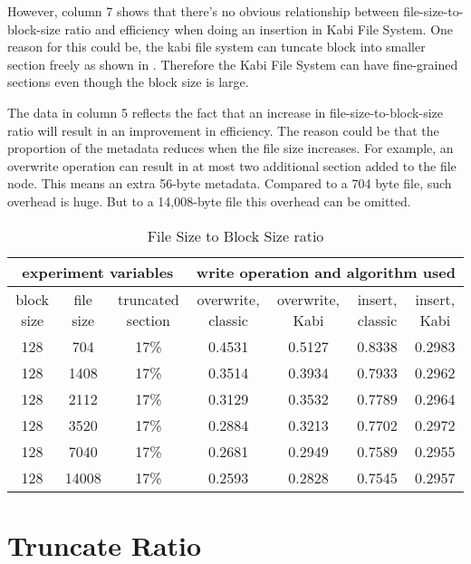     However, column 7 shows that there's no obvious relationship between file-size-to-block-size ratio and efficiency when doing an insertion in Kabi File System. One reason for this could be, the kabi file system can tuncate block into smaller section freely as shown in . Therefore the Kabi File System can have fine-grained sections even though the block size is large. 
    
    The data in column 5 reflects the fact that an increase in file-size-to-block-size ratio will result in an improvement in efficiency. The reason could be that the proportion of the metadata reduces when the file size increases. For example, an overwrite operation can result in at most two additional section added to the file node. This means an extra 56-byte metadata. Compared to a 704 byte file, such overhead is huge. But to a 14,008-byte file this overhead can be omitted.

\begin{lscape} 
\begin{table}
\caption{File Size to Block Size ratio}
\label{tab:fb_ratio}
\begin{center}
\begin{tabular}{|c|c|c|c|c|c|c|}
\hline
\multicolumn{3}{|c|}{experiment variables} & \multicolumn{4}{c|}{write operation and algorithm used} \\
\hline
block size & file size & truncated section & overwrite, classic & overwrite, Kabi & insert, classic & insert, Kabi\\
\hline
128 & 704 & 17\% & 0.4531 & 0.5127 & 0.8338 & 0.2983 \\
\hline
128 & 1408 & 17\% & 0.3514 & 0.3934 & 0.7933 & 0.2962 \\
\hline
128 & 2112 & 17\% & 0.3129 & 0.3532 & 0.7789 & 0.2964 \\
\hline
128 & 3520 & 17\% & 0.2884 & 0.3213 & 0.7702 & 0.2972 \\
\hline
128 & 7040 & 17\% & 0.2681 & 0.2949 & 0.7589 & 0.2955 \\
\hline
128 & 14008 & 17\% & 0.2593 & 0.2828 & 0.7545 & 0.2957 \\
\hline
\end{tabular}
\end{center}
\end{table}
\end{lscape}

\section{Truncate Ratio}

